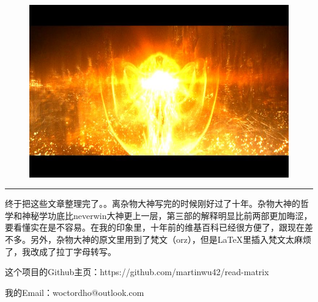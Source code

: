 \documentclass[UTF8]{ctexart}
\newcommand{\myparsep}{\noindent \rule[0.5ex]{\linewidth}{1pt}}
\begin{document}
\begin{figure}[htb]
\centering
\includegraphics[width=0.5\linewidth]{fig/3c153812375c4954f819b8d4.jpg}
\end{figure}


\myparsep

终于把这些文章整理完了。。离杂物大神写完的时候刚好过了十年。杂物大神的哲学和神秘学功底比neverwin大神更上一层，第三部的解释明显比前两部更加晦涩，要看懂实在是不容易。在我的印象里，十年前的维基百科已经很方便了，跟现在差不多。另外，杂物大神的原文里用到了梵文（orz），但是LaTeX里插入梵文太麻烦了，我改成了拉丁字母转写。

这个项目的Github主页：https://github.com/martinwu42/read-matrix

我的Email：woctordho@outlook.com

\end{document}
